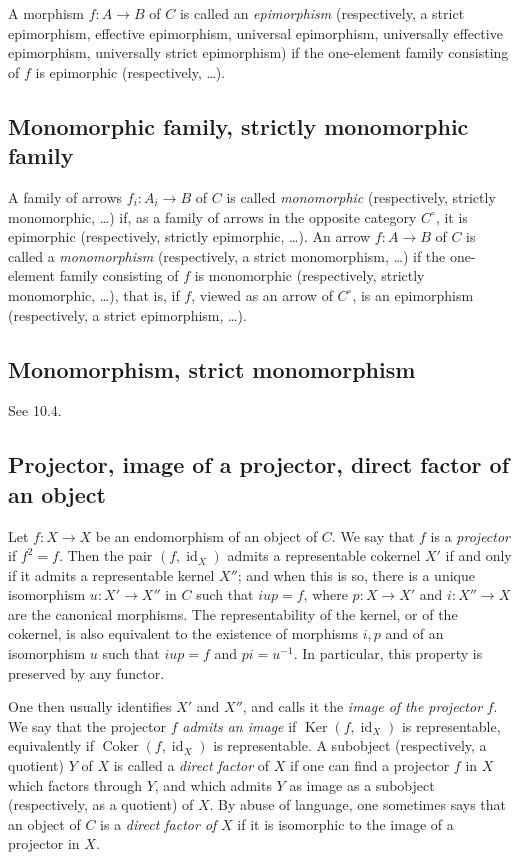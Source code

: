 \documentclass[11pt]{article}
\newcommand{\Ker}{\operatorname{Ker}}
\newcommand{\Coker}{\operatorname{Coker}}
\newcommand{\id}{\operatorname{id}}
\begin{document}
A morphism \(f:A\to B\) of \(C\) is called an \emph{epimorphism} (respectively, a strict epimorphism, effective epimorphism, universal epimorphism, universally effective epimorphism, universally strict epimorphism) if the one-element family consisting of \(f\) is epimorphic (respectively, \ldots).

\subsection{Monomorphic family, strictly monomorphic family}

A family of arrows \(f_i:A_i\to B\) of \(C\) is called \emph{monomorphic} (respectively, strictly monomorphic, \ldots) if, as a family of arrows in the opposite category \(C^\circ\), it is epimorphic (respectively, strictly epimorphic, \ldots). An arrow \(f:A\to B\) of \(C\) is called a \emph{monomorphism} (respectively, a strict monomorphism, \ldots) if the one-element family consisting of \(f\) is monomorphic (respectively, strictly monomorphic, \ldots), that is, if \(f\), viewed as an arrow of \(C^\circ\), is an epimorphism (respectively, a strict epimorphism, \ldots).

\subsection{Monomorphism, strict monomorphism}

See 10.4.

\subsection{Projector, image of a projector, direct factor of an object}

Let \(f:X\to X\) be an endomorphism of an object of \(C\). We say that \(f\) is a \emph{projector} if \(f^2=f\). Then the pair \((f,\id_X)\) admits a representable cokernel \(X'\) if and only if it admits a representable kernel \(X''\); and when this is so, there is a unique isomorphism \(u:X'\to X''\) in \(C\) such that \(iup=f\), where \(p:X\to X'\) and \(i:X''\to X\) are the canonical morphisms. The representability of the kernel, or of the cokernel, is also equivalent to the existence of morphisms \(i,p\) and of an isomorphism \(u\) such that \(iup=f\) and \(pi=u^{-1}\). In particular, this property is preserved by any functor.

One then usually identifies \(X'\) and \(X''\), and calls it the \emph{image of the projector} \(f\). We say that the projector \(f\) \emph{admits an image} if \(\Ker(f,\id_X)\) is representable, equivalently if \(\Coker(f,\id_X)\) is representable. A subobject (respectively, a quotient) \(Y\) of \(X\) is called a \emph{direct factor} of \(X\) if one can find a projector \(f\) in \(X\) which factors through \(Y\), and which admits \(Y\) as image as a subobject (respectively, as a quotient) of \(X\). By abuse of language, one sometimes says that an object of \(C\) is a \emph{direct factor of} \(X\) if it is isomorphic to the image of a projector in \(X\).
\end{document}
